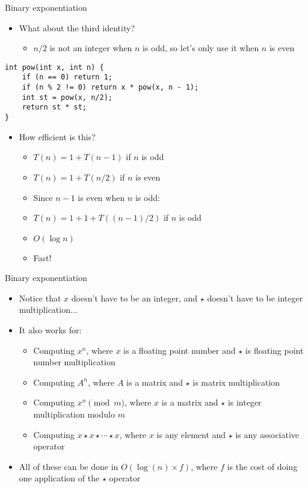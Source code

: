\documentclass[12pt,t]{beamer}
\newcommand{\bi}{\begin{itemize}}
\newcommand{\ei}{\end{itemize}}
\begin{document}
\begin{frame}[fragile]{Binary exponentiation}
    \bi
        \item What about the third identity?
            \bi
                \item $n/2$ is not an integer when $n$ is odd, so let's only use it when $n$ is even
            \ei
    \ei

    \begin{verbatim}
int pow(int x, int n) {
    if (n == 0) return 1;
    if (n % 2 != 0) return x * pow(x, n - 1);
    int st = pow(x, n/2);
    return st * st;
}
    \end{verbatim}

    \bi
        \item How efficient is this?
            \bi
                \item<2-> $T(n) = 1 + T(n-1)$ if $n$ is odd
                \item<2-> $T(n) = 1 + T(n/2)$ if $n$ is even
                \item<3-> Since $n-1$ is even when $n$ is odd:
                \item<3-> $T(n) = 1 + 1 + T((n-1)/2)$ if $n$ is odd
                \item<4-> $O(\log n)$
                \item<4-> Fast!
            \ei
    \ei
\end{frame}

\begin{frame}{Binary exponentiation}
    \vspace{20pt}
    \bi
        \item Notice that $x$ doesn't have to be an integer, and $\star$ doesn't have to be integer multiplication...
        \item It also works for:
            \bi
                \item Computing $x^n$, where $x$ is a floating point number and $\star$ is floating point number multiplication
                \item Computing $A^n$, where $A$ is a matrix and $\star$ is matrix multiplication
                \item Computing $x^n \pmod{m}$, where $x$ is a matrix and $\star$ is integer multiplication modulo $m$
                \item Computing $x\star x\star \cdots \star x$, where $x$ is any element and $\star$ is any associative operator
            \ei

        \item All of these can be done in $O(\log(n) \times f)$, where $f$ is the cost of doing one application of the $\star$ operator
    \ei
\end{frame}
\end{document}
